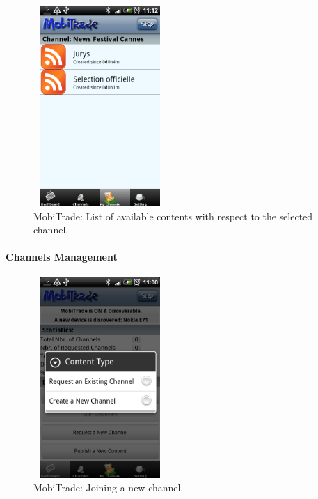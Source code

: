 \begin{figure}[!h]
\begin{center}
\includegraphics[width=2in,height=3in]{Chapitre6/ListContents.png}
\end{center}
\caption{MobiTrade: List of available contents with respect to the selected channel.}
\label{ListAvailableContents}
\end{figure}


\paragraph{Channels Management}


\begin{figure}[!h]
\begin{center}
\includegraphics[width=2in,height=3in]{Chapitre6/JoinChannel.png}
\end{center}
\caption{MobiTrade: Joining a new channel.}
\label{JoiningNewChannel}
\end{figure}


